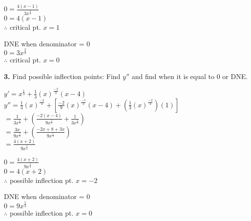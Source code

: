 \documentclass[12pt,fleqn]{book} %
\begin{document}
\begin{multicols}{2}
    \begin{center}
        $0= \frac{4(x-1)}{3x^\frac{2}{3}}$ \\
        \vspace*{1mm}
        $0 = 4(x-1)$ \\
        \vspace*{1mm}
        $\therefore$ critical pt. $x = 1$
        \columnbreak

        DNE when denominator = 0 \\
        \vspace*{1mm}
        $0 = 3x^\frac{2}{3}$ \\
        \vspace*{1mm}
        $\therefore$ critical pt. $x = 0$
    \end{center}
\end{multicols}

\noindent \textbf{3.} Find possible inflection points: Find $y''$ and find when it is equal to 0 or DNE.

\vspace*{-2mm}

\begin{center}
    $y' = x^\frac{1}{3} + \frac{1}{3}(x)^\frac{-2}{3}(x-4)$ \\
    \vspace*{2mm}
    $y'' = \frac{1}{3}(x)^\frac{-2}{3} + [\frac{-2}{9}(x)^\frac{-5}{3}(x-4)+(\frac{1}{3}(x)^\frac{-2}{3})(1)]$ \\
    \vspace*{1mm}
    {\large $= \frac{1}{3x^\frac{2}{3}}+ (\frac{-2(x-4)}{9x^\frac{5}{3}}+\frac{1}{3x^\frac{2}{3}})$} \\
    \vspace*{1mm}
    {\large $= \frac{3x}{9x^\frac{5}{3}} + (\frac{-2x+8 + 3x}{9x^\frac{5}{3}})$} \\
    \vspace*{1mm}
    {\large $= \frac{4(x+2)}{9x^\frac{5}{3}}$}
\end{center}

\begin{multicols}{2}
    \begin{center}
        $0= \frac{4(x+2)}{9x^\frac{5}{3}}$ \\
        \vspace*{1mm}
        $0 = 4(x+2)$ \\
        \vspace*{1mm}
        $\therefore$ possible inflection pt. $x = -2$
        \columnbreak

        DNE when denominator = 0 \\
        \vspace*{1mm}
        $0 = 9x^\frac{5}{3}$ \\
        \vspace*{1mm}
        $\therefore$ possible inflection pt. $x = 0$
    \end{center}
\end{multicols}
\end{document}
